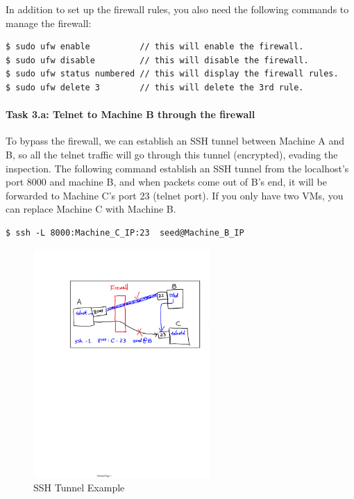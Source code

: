 In addition to set up the firewall rules, you also need the following
commands to manage the firewall: 
\begin{Verbatim}[frame=single] 
$ sudo ufw enable          // this will enable the firewall. 
$ sudo ufw disable         // this will disable the firewall. 
$ sudo ufw status numbered // this will display the firewall rules. 
$ sudo ufw delete 3        // this will delete the 3rd rule.
\end{Verbatim}




\paragraph{Task 3.a: Telnet to Machine B through the firewall}




To bypass the firewall, we can establish an SSH tunnel between
Machine A and B, so all the telnet traffic will go through this tunnel
(encrypted), evading the inspection. The following command 
establish an SSH tunnel from the localhost's port 8000 and 
machine B, and when packets come out of B's end, it will
be forwarded to Machine C's port 23 (telnet port). If you only have two VMs,
you can replace Machine C with Machine B.

\begin{Verbatim}[frame=single] 
$ ssh -L 8000:Machine_C_IP:23  seed@Machine_B_IP
\end{Verbatim}


\begin{figure}[htb]
        \centering
        \includegraphics*[viewport=124 447 580 691, width=0.60\textwidth]{Figs/SSHTunnel.pdf}
        \caption{SSH Tunnel Example}
        \label{fig:sshtunnel}
\end{figure}


